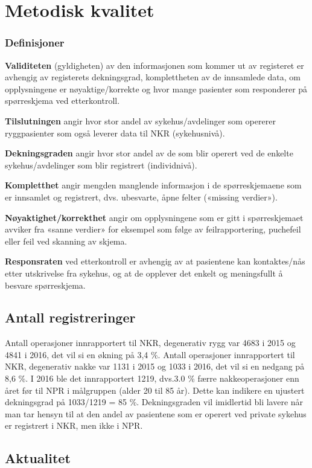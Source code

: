 \documentclass[norsk, a4paper, twocolumn]{report}
\begin{document}
\chapter{Metodisk kvalitet}\label{cha:kva}
\subsection*{Definisjoner}
\textbf{Validiteten} (gyldigheten) av den informasjonen som kommer ut av registeret er avhengig av registerets dekningsgrad, komplettheten av de innsamlede data, om opplysningene er nøyaktige/korrekte og hvor mange pasienter som responderer på spørreskjema ved etterkontroll.

\textbf{Tilslutningen} angir hvor stor andel av sykehus/avdelinger som opererer ryggpasienter som også leverer data til NKR (sykehusnivå).

\textbf{Dekningsgraden}  angir hvor stor andel av de som blir operert ved de enkelte sykehus/avdelinger som blir registrert (individnivå). 

\textbf{Kompletthet } angir mengden manglende informasjon i de spørreskjemaene som er innsamlet og registrert, dvs. ubesvarte, åpne felter («missing verdier»). 

\textbf{Nøyaktighet/korrekthet} angir om opplysningene som er gitt i spørreskjemaet avviker fra «sanne verdier» for eksempel som følge av feilrapportering, puchefeil eller feil ved skanning av skjema. 

\textbf{Responsraten } ved etterkontroll er avhengig av
at pasientene kan kontaktes/nås etter utskrivelse fra sykehus, og at de opplever det enkelt og meningsfullt å besvare spørreskjema.


\section{Antall registreringer}\label{sec:reg}
Antall operasjoner innrapportert til NKR, degenerativ rygg var 4683 i 2015 og 4841 i 2016, det vil si en økning på 3,4 \%.  
Antall operasjoner innrapportert til NKR, degenerativ nakke var 1131 i 2015 og 1033 i 2016, det vil si en nedgang på 8,6 \%. I 2016 ble det innrapportert 1219, dvs.3.0 \% færre  nakkeoperasjoner enn året før til NPR i målgruppen (alder 20 til 85 år). Dette kan indikere en ujustert dekningsgrad på 1033/1219 = 85 \%. Dekningsgraden vil imidlertid bli lavere når man tar hensyn til at den  andel av pasientene som er operert ved private sykehus er registrert i NKR, men ikke i NPR.


\section{Aktualitet}\label{sec:akt}
\end{document}
